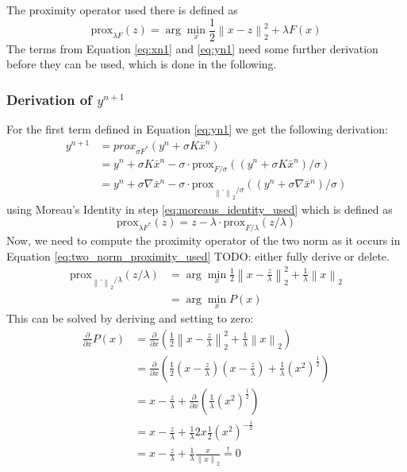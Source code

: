 \documentclass{paper}
\newcommand{\prox}{\text{prox}}
\newcommand{\twonorm}[1]{\left\lVert#1\right\rVert_2}
\begin{document}
The proximity operator used there is defined as 
\begin{equation}
	\prox_{\lambda F}(z) = \arg \min_x \frac{1}{2} \twonorm{x - z}^2 + \lambda F(x)
\end{equation}
The terms from Equation \eqref{eq:xn1} and \eqref{eq:yn1} need some further derivation
before they can be used, which is done in the following.

\subsubsection*{Derivation of $y^{n+1}$}
For the first term defined in Equation \eqref{eq:yn1} we get the following derivation:
\begin{align}
	y^{n+1} &= prox_{\sigma F^*}(y^n + \sigma K \bar{x}^n) \\
			&= y^n + \sigma K \bar{x}^n - 
				\sigma \cdot \prox_{F / \sigma}((y^n + \sigma K \bar{x}^n) / \sigma) 
				\label{eq:moreaus_identity_used} \\
			&= y^n + \sigma \nabla \bar{x}^n - 
				\sigma \cdot \prox_{\twonorm{\cdot} / \sigma}((y^n + \sigma \nabla \bar{x}^n) / \sigma)
				\label{eq:two_norm_proximity_used}
\end{align}
using Moreau's Identity in step \eqref{eq:moreaus_identity_used} which is defined as
\begin{equation}
	\prox_{\lambda F^*}(z) = z - \lambda \cdot \prox_{F/ \lambda}(z / \lambda) 
\end{equation}
Now, we need to compute the proximity operator of the two norm as it 
occurs in Equation \eqref{eq:two_norm_proximity_used} TODO: either fully derive or delete.
\begin{align}
	\prox_{\twonorm{\cdot} / \lambda}(z / \lambda) 
	&= \arg \min_x \frac{1}{2} \twonorm{x - \frac{z}{\lambda}}^2 +
	\frac{1}{\lambda} \twonorm{x} \\
	\label{eq:P_x}
	&= \arg \min_x P(x)
\end{align}
This can be solved by deriving and setting to zero:
\begin{align}
\frac{\partial}{\partial x} P(x) &= 
	\frac{\partial}{\partial x} \left(
 		\frac{1}{2} \twonorm{x - \frac{z}{\lambda}}^2 +
		\frac{1}{\lambda} \twonorm{x} 
	\right) \\
&= 
	\frac{\partial}{\partial x} \left(
		\frac{1}{2} (x-\frac{z}{\lambda}) (x-\frac{z}{\lambda}) + 
		\frac{1}{\lambda} (x^2)^{\frac{1}{2}}
	\right) \\
&= 
	x-\frac{z}{\lambda} + 
	\frac{\partial}{\partial x} \left(
		\frac{1}{\lambda} (x^2)^{\frac{1}{2}}
	\right) \\
&= 
	x-\frac{z}{\lambda} + 
	\frac{1}{\lambda} 2x \frac{1}{2} (x^2)^{-\frac{1}{2}} \\
&= 
	x-\frac{z}{\lambda} + 
	\frac{1}{\lambda} \frac{x}{\twonorm{x}} \overset{!}{=} 0 
	\label{eq:proximity_operator_l2_norm_fail}
\end{align}
\end{document}
